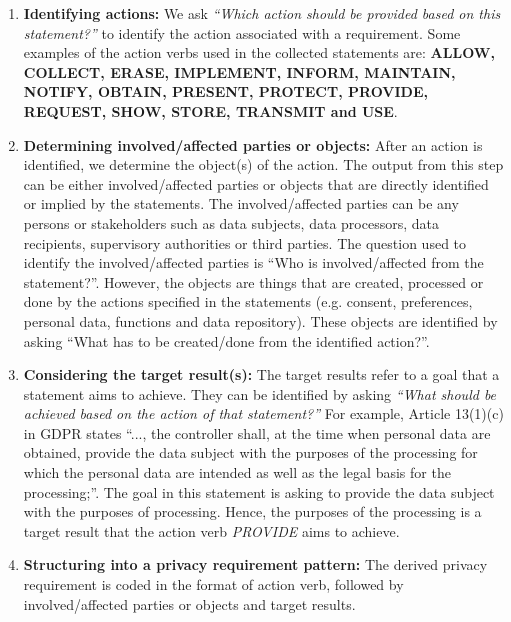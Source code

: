 \begin{enumerate}[leftmargin=*, noitemsep]
	
	\item \textbf{Identifying actions:} We ask \textit{``Which action should be provided based on this statement?''} to identify the action associated with a requirement. Some examples of the action verbs used in the collected statements are: \textbf{ALLOW, COLLECT, ERASE, IMPLEMENT, INFORM, MAINTAIN, NOTIFY, OBTAIN, PRESENT, PROTECT, PROVIDE, REQUEST, SHOW, STORE, TRANSMIT and USE}.
	
	\item \textbf{Determining involved/affected parties or objects:} After an action is identified, we determine the object(s) of the action. The output from this step can be either involved/affected parties or objects that are directly identified or implied by the statements. The involved/affected parties can be any persons or stakeholders such as data subjects, data processors, data recipients, supervisory authorities or third parties. The question used to identify the involved/affected parties is ``Who is involved/affected from the statement?''. However, the objects are things that are created, processed or done by the actions specified in the statements (e.g. consent, preferences, personal data, functions and data repository). These objects are identified by asking ``What has to be created/done from the identified action?''. %
	
	\item \textbf{Considering the target result(s):} The target results refer to a goal that a statement aims to achieve. They can be identified by asking \textit{``What should be achieved based on the action of that statement?''} For example, Article 13(1)(c) in GDPR states ``..., the controller shall, at the time when personal data are obtained, provide the data subject with the purposes of the processing for which the personal data are intended as well as the legal basis for the processing;''. The goal in this statement is asking to provide the data subject with the purposes of processing. Hence, the purposes of the processing is a target result that the action verb \textit{PROVIDE} aims to achieve.
	
	\item \textbf{Structuring into a privacy requirement pattern:} The derived privacy requirement is coded in the format of action verb, followed by involved/affected parties or objects and target results.
	
\end{enumerate}

